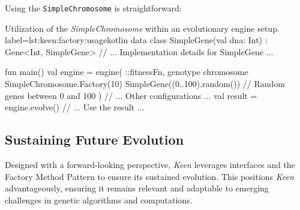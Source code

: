     Using the \texttt{SimpleChromosome} is straightforward:

    \begin{code}{
      Utilization of the \textit{SimpleChromosome} within an evolutionary 
      engine setup.
    }{label=lst:keen:factory:usage}{kotlin}
      data class SimpleGene(val dna: Int) : Gene<Int, SimpleGene> {
          // ... Implementation details for SimpleGene ...
      }
            
      fun main() {
          val engine = engine(
              ::fitnessFn,
              genotype {
                  chromosome {
                      SimpleChromosome.Factory(10) { SimpleGene((0..100).random()) } // Random genes between 0 and 100
                  }
              }
          ) {
              // ... Other configurations ...
          }
          val result = engine.evolve()
          // ... Use the result ...
      }
    \end{code}

  \subsection{Sustaining Future Evolution}
    Designed with a forward-looking perspective, \textit{Keen} leverages 
    interfaces and the Factory Method Pattern to ensure its sustained 
    evolution. This positions \textit{Keen} advantageously, ensuring it remains 
    relevant and adaptable to emerging challenges in genetic algorithms and 
    computations.
